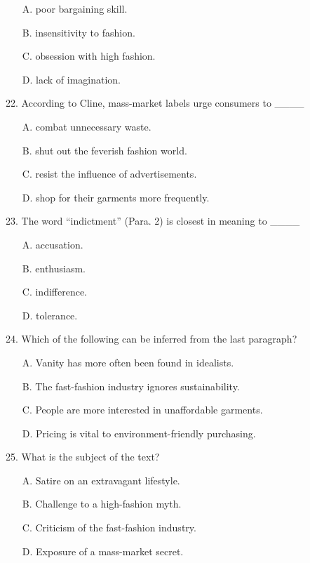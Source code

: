 \documentclass[UTF8,11pt]{ctexart}
\begin{document}
\begin{itemize}[leftmargin=2em,itemsep=.2em,topsep=.4em]\item[A.] poor bargaining skill.
\item[B.] insensitivity to fashion.
\item[C.] obsession with high fashion.
\item[D.] lack of imagination.
\end{itemize}

22. According to Cline, mass-market labels urge consumers to \_\_\_\_


\begin{itemize}[leftmargin=2em,itemsep=.2em,topsep=.4em]\item[A.] combat unnecessary waste.
\item[B.] shut out the feverish fashion world.
\item[C.] resist the influence of advertisements.
\item[D.] shop for their garments more frequently.
\end{itemize}

23. The word “indictment” (Para. 2) is closest in meaning to \_\_\_\_


\begin{itemize}[leftmargin=2em,itemsep=.2em,topsep=.4em]\item[A.] accusation.
\item[B.] enthusiasm.
\item[C.] indifference.
\item[D.] tolerance.
\end{itemize}

24. Which of the following can be inferred from the last paragraph?


\begin{itemize}[leftmargin=2em,itemsep=.2em,topsep=.4em]\item[A.] Vanity has more often been found in idealists.
\item[B.] The fast-fashion industry ignores sustainability.
\item[C.] People are more interested in unaffordable garments.
\item[D.] Pricing is vital to environment-friendly purchasing.
\end{itemize}

25. What is the subject of the text?


\begin{itemize}[leftmargin=2em,itemsep=.2em,topsep=.4em]\item[A.] Satire on an extravagant lifestyle.
\item[B.] Challenge to a high-fashion myth.
\item[C.] Criticism of the fast-fashion industry.
\item[D.] Exposure of a mass-market secret.
\end{itemize}
\end{document}
